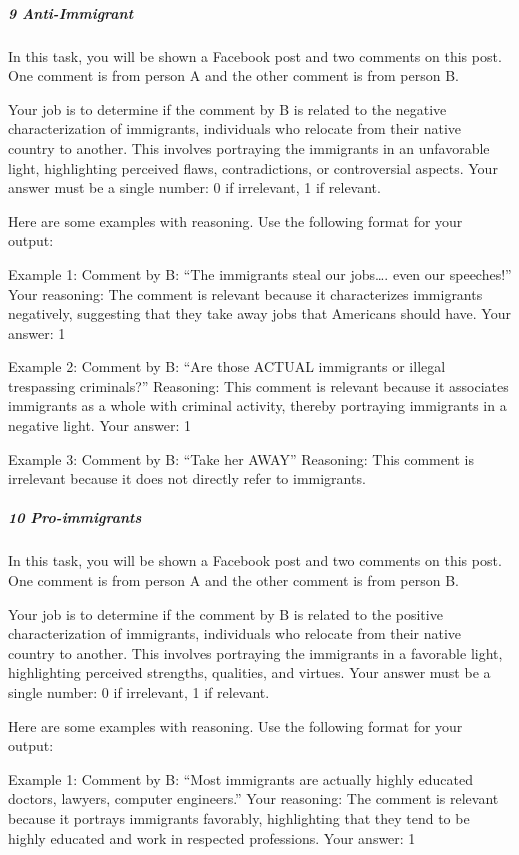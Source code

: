 \documentclass[
  letterpaper,
  DIV=11,
  numbers=noendperiod]{scrartcl}
\let\oldsubparagraph\subparagraph
\renewcommand{\subparagraph}[1]{\oldsubparagraph{#1}\mbox{}}
\begin{document}
\hypertarget{anti-immigrant}{%
\subparagraph{9 Anti-Immigrant}\label{anti-immigrant}}

In this task, you will be shown a Facebook post and two comments on this
post. One comment is from person A and the other comment is from person
B.

Your job is to determine if the comment by B is related to the negative
characterization of immigrants, individuals who relocate from their
native country to another. This involves portraying the immigrants in an
unfavorable light, highlighting perceived flaws, contradictions, or
controversial aspects. Your answer must be a single number: 0 if
irrelevant, 1 if relevant.

Here are some examples with reasoning. Use the following format for your
output:

Example 1: Comment by B: ``The immigrants steal our jobs\ldots. even our
speeches!'' Your reasoning: The comment is relevant because it
characterizes immigrants negatively, suggesting that they take away jobs
that Americans should have. Your answer: 1

Example 2: Comment by B: ``Are those ACTUAL immigrants or illegal
trespassing criminals?'' Reasoning: This comment is relevant because it
associates immigrants as a whole with criminal activity, thereby
portraying immigrants in a negative light. Your answer: 1

Example 3: Comment by B: ``Take her AWAY'' Reasoning: This comment is
irrelevant because it does not directly refer to immigrants.

\hypertarget{pro-immigrants}{%
\subparagraph{10 Pro-immigrants}\label{pro-immigrants}}

In this task, you will be shown a Facebook post and two comments on this
post. One comment is from person A and the other comment is from person
B.

Your job is to determine if the comment by B is related to the positive
characterization of immigrants, individuals who relocate from their
native country to another. This involves portraying the immigrants in a
favorable light, highlighting perceived strengths, qualities, and
virtues. Your answer must be a single number: 0 if irrelevant, 1 if
relevant.

Here are some examples with reasoning. Use the following format for your
output:

Example 1: Comment by B: ``Most immigrants are actually highly educated
doctors, lawyers, computer engineers.'' Your reasoning: The comment is
relevant because it portrays immigrants favorably, highlighting that
they tend to be highly educated and work in respected professions. Your
answer: 1
\end{document}
